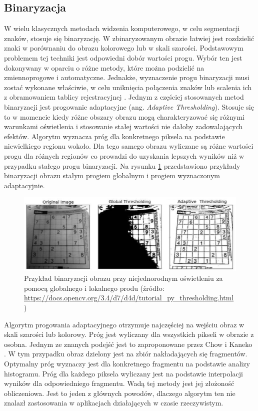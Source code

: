 \subsection{Binaryzacja}
W wielu klasycznych metodach widzenia komputerowego, w celu segmentacji znaków, stosuje się binaryzację.
W zbinaryzowanym obrazie łatwiej jest rozdzielić znaki w porównaniu do obrazu kolorowego lub w skali szarości.
Podstawowym problemem tej techniki jest odpowiedni dobór wartości progu.
Wybór ten jest dokonywany w oparciu o różne metody, które można podzielić na zmiennoprogowe i automatyczne.
Jednakże, wyznaczenie progu binaryzacji musi zostać wykonane właściwie, w celu uniknięcia połączenia znaków lub scalenia ich z obramowaniem tablicy rejestracyjnej \cite{6213519}.
Jednym z częściej stosowanych metod binaryzacji jest progowanie adaptacyjne (ang. \textit{Adaptive Thresholding}).
Stosuje się to w momencie kiedy różne obszary obrazu mogą charakteryzować się różnymi warunkami oświetlenia i stosowanie stałej wartości nie dałoby zadowalających efektów.
Algorytm wyznacza próg dla konkretnego piksela na podstawie niewielkiego regionu wokoło.
Dla tego samego obrazu wyliczane są różne wartości progu dla różnych regionów co prowadzi do uzyskania lepszych wyników niż w przypadku stałego progu binaryzacji.
Na rysunku \ref{fig:threshold} przedstawiono przykłady binaryzacji obrazu stałym progiem globalnym i progiem wyznaczonym adaptacyjnie.
\begin{figure}[!ht]
    \centering
    \includegraphics[scale=0.6]{Pictures/threshold}
    \caption{Przykład binaryzacji obrazu przy niejednorodnym oświetleniu za pomocą globalnego i lokalnego produ (źródło: \url{https://docs.opencv.org/3.4/d7/d4d/tutorial_py_thresholding.html})}
    \label{fig:threshold}
\end{figure}
\FloatBarrier

Algorytm progowania adaptacyjnego otrzymuje najczęściej na wejściu obraz w skali szarości lub kolorowy.
Próg jest wyliczany dla wszystkich pikseli w obrazie z osobna.
Jednym ze znanych podejść jest to zaproponowane przez Chow i Kaneko \cite{Chow1971BoundaryDO}.
W tym przypadku obraz dzielony jest na zbiór nakładających się fragmentów.
Optymalny próg wyznaczy jest dla konkretnego fragmentu na podstawie analizy histogramu.
Próg dla każdego piksela wyliczany jest na podstawie interpolacji wyników dla odpowiedniego fragmentu.
Wadą tej metody jest jej złożoność obliczeniowa.
Jest to jeden z głównych powodów, dlaczego algorytm ten nie znalazł zastosowania w aplikacjach działających w czasie rzeczywistym.

